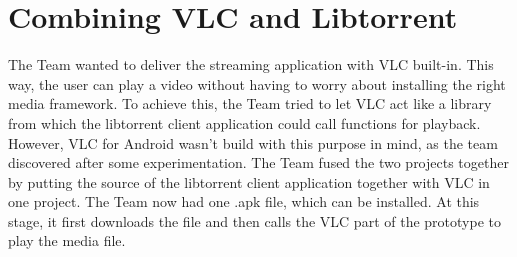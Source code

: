 \section{Combining VLC and Libtorrent}
\thispagestyle{fancy}
\label{sec:one_apk}
The Team wanted to deliver the streaming application with VLC built-in. This way, the user can play a video without having to worry about installing the right media framework. To achieve this, the Team tried to let VLC act like a library from which the libtorrent client application could call functions for playback. However, VLC for Android wasn't build with this purpose in mind, as the team discovered after some experimentation. The Team fused the two projects together by putting the source of the libtorrent client application together with VLC in one project. The Team now had one .apk file, which can be installed. At this stage, it first downloads the file and then calls the VLC part of the prototype to play the media file.